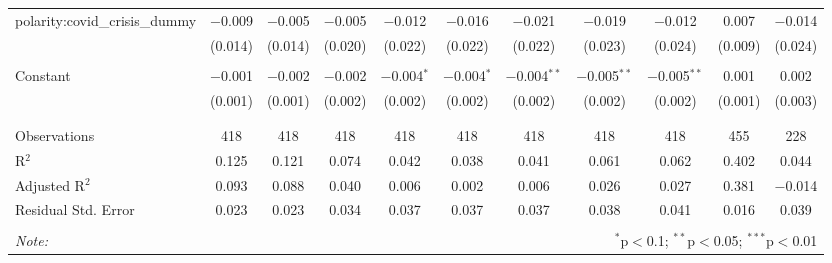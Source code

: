 \begin{table}[!htbp]
\begin{adjustbox}{width=1.25\textwidth}
\begin{tabular}{@{\extracolsep{5pt}}lcccccccccc}
 polarity:covid\_crisis\_dummy & $-$0.009 & $-$0.005 & $-$0.005 & $-$0.012 & $-$0.016 & $-$0.021 & $-$0.019 & $-$0.012 & 0.007 & $-$0.014 \\ 
  & (0.014) & (0.014) & (0.020) & (0.022) & (0.022) & (0.022) & (0.023) & (0.024) & (0.009) & (0.024) \\ 
  & & & & & & & & & & \\ 
 Constant & $-$0.001 & $-$0.002 & $-$0.002 & $-$0.004$^{*}$ & $-$0.004$^{*}$ & $-$0.004$^{**}$ & $-$0.005$^{**}$ & $-$0.005$^{**}$ & 0.001 & 0.002 \\ 
  & (0.001) & (0.001) & (0.002) & (0.002) & (0.002) & (0.002) & (0.002) & (0.002) & (0.001) & (0.003) \\ 
  & & & & & & & & & & \\ 
\hline \\[-1.8ex] 
Observations & 418 & 418 & 418 & 418 & 418 & 418 & 418 & 418 & 455 & 228 \\ 
R$^{2}$ & 0.125 & 0.121 & 0.074 & 0.042 & 0.038 & 0.041 & 0.061 & 0.062 & 0.402 & 0.044 \\ 
Adjusted R$^{2}$ & 0.093 & 0.088 & 0.040 & 0.006 & 0.002 & 0.006 & 0.026 & 0.027 & 0.381 & $-$0.014 \\ 
Residual Std. Error & 0.023 & 0.023 & 0.034 & 0.037 & 0.037 & 0.037 & 0.038 & 0.041 & 0.016 & 0.039 \\ 
\hline 
\hline \\[-1.8ex] 
\textit{Note:}  & \multicolumn{10}{r}{$^{*}$p$<$0.1; $^{**}$p$<$0.05; $^{***}$p$<$0.01} \\ 
\end{tabular} 
\end{adjustbox} 
\end{table} 
